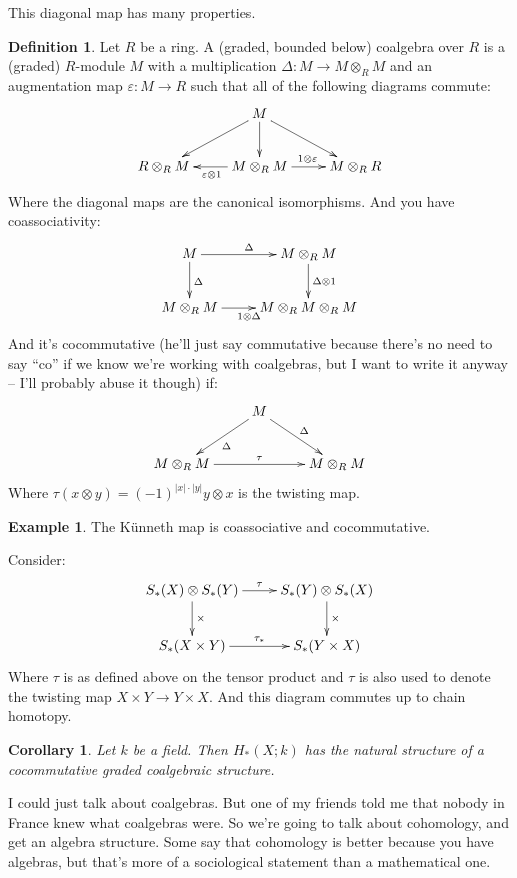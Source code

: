 \documentclass{amsart}
\theoremstyle{theorem}
\newtheorem{corollary}[theorem]{Corollary}
\theoremstyle{definition}
\newtheorem{definition}[theorem]{Definition}
\newtheorem{example}[theorem]{Example}
\begin{document}
This diagonal map has many properties.
\begin{definition}
Let $R$ be a ring. A (graded, bounded below) coalgebra over $R$ is a (graded) $R$-module $M$ with a multiplication $\Delta:M\to M\otimes_R M$ and an augmentation map $\varepsilon:M\to R$ such that all of the following diagrams commute:
\begin{equation*}
\xymatrix{ & M\ar[d]\ar[dr]\ar[dl] & \\
R\otimes_R M & M\otimes_R M\ar[l]^{\varepsilon\otimes 1}\ar[r]^{1\otimes\varepsilon} & M\otimes_R R}
\end{equation*}
Where the diagonal maps are the canonical isomorphisms. And you have coassociativity:
\begin{equation*}
\xymatrix{
	M\ar[r]^{\Delta}\ar[d]^{\Delta} & M\otimes_R M\ar[d]^{\Delta\otimes 1}\\
	M\otimes_R M\ar[r]_{1\otimes\Delta} & M\otimes_R M\otimes_R M
}
\end{equation*}
And it's cocommutative (he'll just say commutative because there's no need to say ``co'' if we know we're working with coalgebras, but I want to write it anyway -- I'll probably abuse it though) if:
\begin{equation*}
\xymatrix{
	 & M\ar[dl]^\Delta\ar[dr]^\Delta &\\
	M\otimes_R M\ar[rr]^{\tau} & & M\otimes_R M
}
\end{equation*}
Where $\tau(x\otimes y)=(-1)^{|x|\cdot|y|}y\otimes x$ is the twisting map.
\end{definition}
\begin{example}
The K\"{u}nneth map is coassociative and cocommutative.
\end{example}
Consider:
\begin{equation*}
\xymatrix{S_\ast(X)\otimes S_\ast(Y)\ar[r]^{\tau}\ar[d]^{\times} & S_\ast(Y)\otimes S_\ast(X)\ar[d]^{\times}\\
S_\ast(X\times Y)\ar[r]^{\tau_\ast} & S_\ast(Y\times X)}
\end{equation*}
Where $\tau$ is as defined above on the tensor product and $\tau$ is also used to denote the twisting map $X\times Y\to Y\times X$. And this diagram commutes up to chain homotopy.
\begin{corollary}
Let $k$ be a field. Then $ H_\ast(X;k)$ has the natural structure of a cocommutative graded coalgebraic structure. 
\end{corollary}
I could just talk about coalgebras. But one of my friends told me that nobody in France knew what coalgebras were. So we're going to talk about cohomology, and get an algebra structure. Some say that cohomology is better because you have algebras, but that's more of a sociological statement than a mathematical one.
\end{document}
